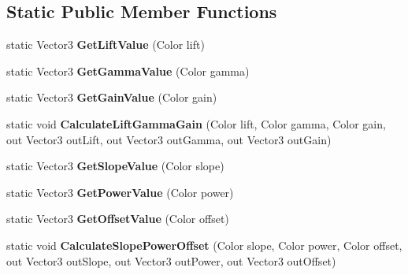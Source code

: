 \subsection*{Static Public Member Functions}
\begin{DoxyCompactItemize}
\item 
\mbox{\label{class_unity_engine_1_1_post_processing_1_1_color_grading_component_a04daf0a2a8a42ead0163935f90d3f1f9}} 
static Vector3 {\bfseries Get\+Lift\+Value} (Color lift)
\item 
\mbox{\label{class_unity_engine_1_1_post_processing_1_1_color_grading_component_a24d6c535749a5f5dc47e98607d4c9816}} 
static Vector3 {\bfseries Get\+Gamma\+Value} (Color gamma)
\item 
\mbox{\label{class_unity_engine_1_1_post_processing_1_1_color_grading_component_a49b829055865dc106c6e19cce8aedb00}} 
static Vector3 {\bfseries Get\+Gain\+Value} (Color gain)
\item 
\mbox{\label{class_unity_engine_1_1_post_processing_1_1_color_grading_component_a5b5248a23b4acc1ea1b5897d13fb1896}} 
static void {\bfseries Calculate\+Lift\+Gamma\+Gain} (Color lift, Color gamma, Color gain, out Vector3 out\+Lift, out Vector3 out\+Gamma, out Vector3 out\+Gain)
\item 
\mbox{\label{class_unity_engine_1_1_post_processing_1_1_color_grading_component_ae2018d90179b6aa3f02e04e8884cc2bf}} 
static Vector3 {\bfseries Get\+Slope\+Value} (Color slope)
\item 
\mbox{\label{class_unity_engine_1_1_post_processing_1_1_color_grading_component_a9f7481136a36d81b1eea1faa04250bda}} 
static Vector3 {\bfseries Get\+Power\+Value} (Color power)
\item 
\mbox{\label{class_unity_engine_1_1_post_processing_1_1_color_grading_component_a2819904531cd17c52080489f09b36db6}} 
static Vector3 {\bfseries Get\+Offset\+Value} (Color offset)
\item 
\mbox{\label{class_unity_engine_1_1_post_processing_1_1_color_grading_component_a3233c060966fe59cc49a5fc241119748}} 
static void {\bfseries Calculate\+Slope\+Power\+Offset} (Color slope, Color power, Color offset, out Vector3 out\+Slope, out Vector3 out\+Power, out Vector3 out\+Offset)
\end{DoxyCompactItemize}
